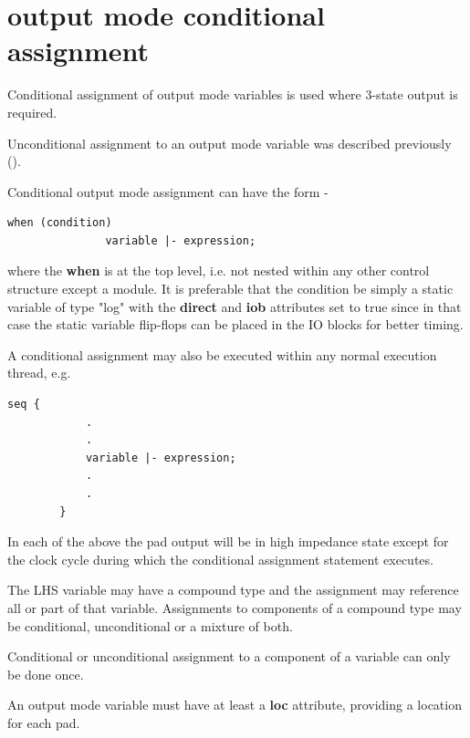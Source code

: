     \section{output mode conditional assignment}\label{sec:target_outputtass}

        Conditional assignment of output mode variables is used where 3-state
        output is required.
        
        Unconditional assignment to an output mode variable was described
        previously ().

        Conditional output mode assignment can have the form -
        \begin{lstlisting}[gobble=8, language=threepl]
        when (condition)
               variable |- expression;
        \end{lstlisting}
        where the {\bf when} is at the top level, i.e. not nested within any other
        control structure except a module. It is preferable that the condition be
        simply a static variable of type "log" with the {\bf direct} and {\bf iob}
        attributes set to true since in that case the static variable flip-flops
        can be placed in the IO blocks for better timing.
        
        A conditional assignment may also be executed within any normal execution
        thread, e.g.
        \begin{lstlisting}[gobble=8, language=threepl]
        seq {
            .
            .
            variable |- expression;
            .
            .
        }
        \end{lstlisting}
        
        In each of the above the pad output will be in high impedance state except
        for the clock cycle during which the conditional assignment statement
        executes.
                
        The LHS variable may have a compound type and the assignment may reference
        all or part of that variable. Assignments to components of a compound type
        may be conditional, unconditional or a mixture of both.
        
        Conditional or unconditional assignment to a component of a variable can
        only be done once.
        
        An output mode variable must have at least a {\bf loc} attribute,
        providing a location for each pad.

